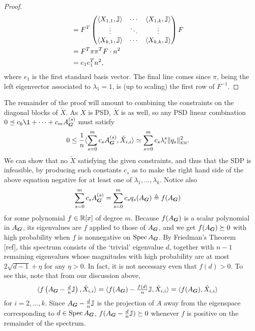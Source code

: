\begin{proof}
\begin{align*}
        &= F^T\begin{pmatrix}
        \langle X_{1,1},\mathbb{J}\rangle & \cdots & \langle X_{1,k},\mathbb{J}\rangle \\
        \vdots & \ddots & \vdots \\
        \langle X_{k,1},\mathbb{J}\rangle & \cdots & \langle X_{k,k},\mathbb{J}\rangle 
        \end{pmatrix} F \\
        &= F^T \pi\pi^T F \cdot n^2\\
        &= e_1 e_1^T n^2,
    \end{align*}
    where $e_1$ is the first standard basis vector. The final line comes since $\pi$, being the left eigenvector associated to $\lambda_1 = 1$, is (up to scaling) the first row of $F^{-1}$.
\end{proof}

The remainder of the proof will amount to combining the constraints on the diagonal blocks of $\check X$. As $X$ is PSD, $\check X$ is as well, so any PSD linear combination $0 \preceq c_0\1 + \cdots + c_m \nb{s}{\bG}$ must satisfy
$$
    0 \le \frac{1}{n}\langle \sum_{s=0}^m c_s A^{(s)}_{\boldsymbol{G}}, \check X_{i,i} \rangle \simeq \sum_{s=0}^m c_s \lambda_i^s \|q_s\|^2_{\textsc{km}}.
$$
We can show that no $\check X$ satisfying the given constraints, and thus that the SDP is infeasible, by producing such constants $c_s$ as to make the right hand side of the above equation negative for at least one of $\lambda_1,...,\lambda_k$. Notice also
$$
    \sum_{s=0}^m c_s A^{(s)}_{\boldsymbol{G}} = \sum_{s=0}^m c_s q_s(A_{\boldsymbol{G}}) \triangleq f(A_{\boldsymbol{G}})
$$
for some polynomial $f \in \mathbb{R}[x]$ of degree $m$. Because $f(A_{\boldsymbol{G}})$ is a scalar polynomial in $A_{\boldsymbol{G}}$, its eigenvalues are $f$ applied to those of $A_{\boldsymbol{G}}$, and we get $f(A_{\boldsymbol{G}}) \succeq 0$ with high probability  when $f$ is nonnegative on $\operatorname{Spec} A_{\boldsymbol{G}}$. By Friedman's Theorem [ref], this spectrum consists of the `trivial' eigenvalue $d$, together with $n-1$ remaining eigenvalues whose magnitudes with high probability are at most $2\sqrt{d-1} + \eta$ for any $\eta > 0$. In fact, it is not necessary even that $f(d) > 0$. To see this, note that from our discussion above,
$$
    \langle f\left(A_{\boldsymbol{G}} - \tfrac{d}{n}\mathbb{J}\right),\check X_{i,i} \rangle = \langle f(A_{\boldsymbol{G}}) - \tfrac{f(d)}{n}\mathbb{J}, \check X_{i,i} \rangle = \langle f(A_{\boldsymbol{G}}), \check X_{i,i} \rangle
$$
for $i = 2,...,k$. Since $A_{\boldsymbol{G}} - \tfrac{d}{n}\mathbb{J}$ is the projection of $A$ away from the eigenspace corresponding to $d \in \operatorname{Spec} A_{\boldsymbol{G}}$, $f(A_{\boldsymbol{G}} - \tfrac{d}{n}\mathbb{J}) \succeq 0$ whenever $f$ is positive on the remainder of the spectrum.


